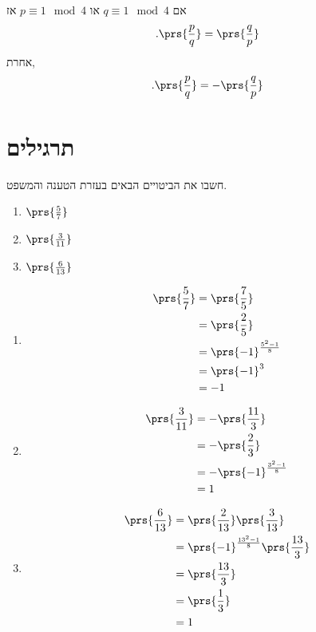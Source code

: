 \documentclass[a4paper,10pt,twoside,openany]{book}
\begin{document}
\begin{corollary}
אם
$q \equiv 1 \mod{4}$
או
$p \equiv 1 \mod{4}$
אז
\[\text{.}\prs{\frac{p}{q}} = \prs{\frac{q}{p}}\]
אחרת,
\[\text{.} \prs{\frac{p}{q}} = - \prs{\frac{q}{p}}\]
\end{corollary}

\section*{תרגילים}

\begin{exercisechap}
חשבו את הביטויים הבאים בעזרת הטענה והמשפט.
\begin{enumerate}
\item $\prs{\frac{5}{7}}$
\item $\prs{\frac{3}{11}}$
\item $\prs{\frac{6}{13}}$
\end{enumerate}
\end{exercisechap}

\begin{solution}
\begin{enumerate}
\item
\begin{align*}
\prs{\frac{5}{7}} &= \prs{\frac{7}{5}}
\\&= \prs{\frac{2}{5}}
\\&= \prs{-1}^{\frac{5^2 - 1}{8}}
\\&= \prs{-1}^3
\\&= -1
\end{align*}
\item
\begin{align*}
\prs{\frac{3}{11}} &= - \prs{\frac{11}{3}}
\\&= - \prs{\frac{2}{3}}
\\&= - \prs{-1}^{\frac{3^2 - 1}{8}}
\\&= 1
\end{align*}
\item
\begin{align*}
\prs{\frac{6}{13}} &= \prs{\frac{2}{13}} \prs{\frac{3}{13}}
\\&= \prs{-1}^{\frac{13^2 - 1}{8}} \prs{\frac{13}{3}}
\\&=  \prs{\frac{13}{3}}
\\&= \prs{\frac{1}{3}}
\\&= 1
\end{align*}
\end{enumerate}
\end{solution}
\end{document}
